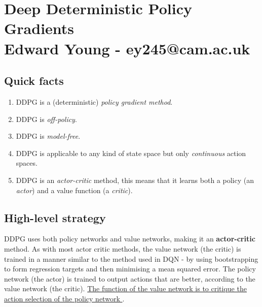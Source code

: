 \documentclass[]{article}
\title{}
\author{Edward Young \\ \large ey245@cam.ac.uk}
\date{}
\begin{document}
\section*{Deep Deterministic Policy Gradients \\ \small Edward Young - ey245@cam.ac.uk}

\subsection*{Quick facts}
\begin{enumerate}
	\item DDPG is a (deterministic) \emph{policy gradient method}. 
	\item DDPG is \emph{off-policy}.
	\item DDPG is \emph{model-free}.
	\item DDPG is applicable to any kind of state space but only \emph{continuous} action spaces.
	\item DDPG is an \emph{actor-critic} method, this means that it learns both a policy (an \emph{actor}) and a value function (a \emph{critic}). 
\end{enumerate}

\subsection*{High-level strategy}
DDPG uses both policy networks and value networks, making it an \textbf{actor-critic} method. As with most actor critic methods, the value network (the critic) is trained in a manner similar to the method used in DQN - by using bootstrapping to form regression targets and then minimising a mean squared error. The policy network (the actor) is trained to output actions that are better, according to the value network (the critic). \ul{The function of the value network is to critique the action selection of the policy network }.

\iffalse
\end{document}
